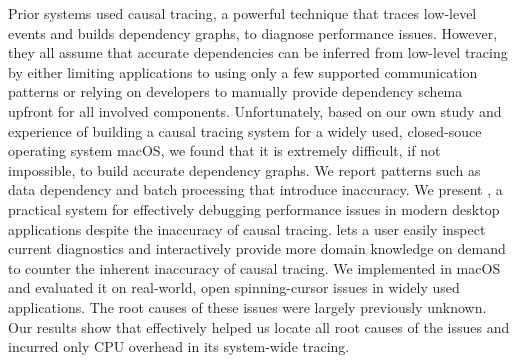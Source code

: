 Prior systems used causal tracing, a powerful technique that traces low-level
events and builds dependency graphs, to diagnose performance issues. However,
they all assume that accurate dependencies can be inferred from low-level
tracing by either limiting applications to using only a few supported
communication patterns or relying on developers to manually provide dependency
schema upfront for all involved components. Unfortunately, based on our own
study and experience of building a causal tracing system for a widely used,
closed-souce operating system macOS, we found that it is extremely difficult,
if not impossible, to build accurate dependency graphs. We report patterns
such as data dependency and batch processing that introduce inaccuracy. We
present \xxx, a practical system for effectively debugging performance issues
in modern desktop applications despite the inaccuracy of causal tracing. \xxx
lets a user easily inspect current diagnostics and interactively provide
more domain knowledge on demand to counter the inherent inaccuracy of causal
tracing. We implemented \xxx in macOS and evaluated it on \nbug real-world, open
spinning-cursor issues in widely used applications. The root causes of these
issues were largely previously unknown. Our results show that \xxx effectively
helped us locate all root causes of the issues and incurred only \cpuoverhead
CPU overhead in its system-wide tracing.
